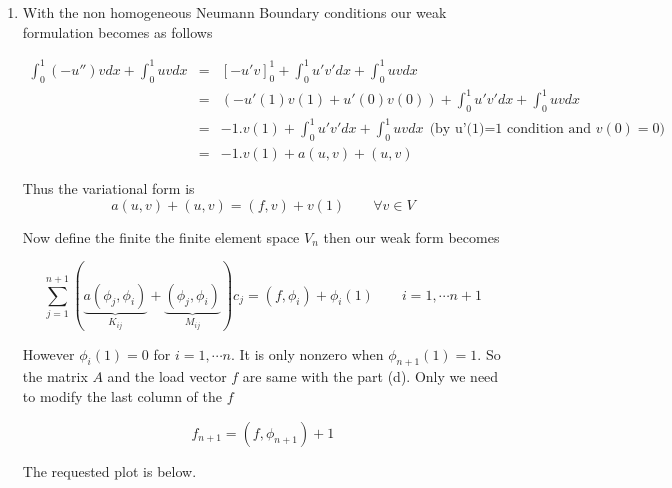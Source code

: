 {\begin{solution}
\begin{enumerate}
The above plot was produced using the following MATLAB code.



\item With the non homogeneous Neumann Boundary conditions our weak formulation becomes as follows

\begin{eqnarray*}
\int_0^1(-u'') v dx+ \int_0^1 u v dx &=& \left[-u' v\right]_0^1 + \int_0^1 u'v' dx + \int_0^1 u v dx \\
&=&\left(-u'(1) v(1) + u'(0)v(0)\right) + \int_0^1 u'v' dx +  \int_0^1u v dx \\
&=& -1 . v(1)+ \int_0^1 u'v' dx + \int_0^1 u v dx \:\: \mbox{(by u'(1)=1 condition and $v(0)=0$)} \\
&=& -1 . v(1)+ a(u,v)+ (u,v)
\end{eqnarray*}

Thus the variational form is
\[ a(u,v)+ (u,v)  = (f,v) + v(1) \qquad \forall v \in V\]

Now define the finite the finite element space $V_n$ then our weak form becomes 

\[ \sum_{j=1}^{n+1}\left( \underbrace{a( \phi_j, \phi_i)}_{K_{ij}} + \underbrace{(\phi_j, \phi_i)}_{M_{ij}}\right) c_j   = (f,\phi_i) + \phi_i(1) \qquad  i=1, \cdots n+1\]

However $\phi_i(1)=0$ for $i=1, \cdots n$. It is only nonzero when $\phi_{n+1}(1)=1$. So the matrix $A$ and the load vector $f$ are same with the part (d). Only we need to modify the last column of the $f$ 

\[
f_{n+1}=(f,\phi_{n+1})+1
\]

The requested plot is below.


\end{enumerate}
\end{solution}}
